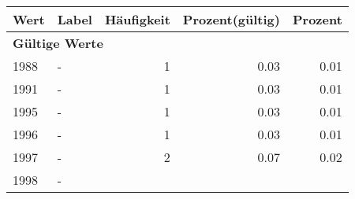      \begin{longtable}{lXrrr}
     \toprule
     \textbf{Wert} & \textbf{Label} & \textbf{Häufigkeit} & \textbf{Prozent(gültig)} & \textbf{Prozent} \\
     \endhead
     \midrule
     \multicolumn{5}{l}{\textbf{Gültige Werte}}\\

     1988 &
     \multicolumn{1}{X}{ -  } &


       \num{1} &
       \num[round-mode=places,round-precision=2]{0.03} &
         \num[round-mode=places,round-precision=2]{0.01} \\

     1991 &
     \multicolumn{1}{X}{ -  } &


       \num{1} &
       \num[round-mode=places,round-precision=2]{0.03} &
         \num[round-mode=places,round-precision=2]{0.01} \\

     1995 &
     \multicolumn{1}{X}{ -  } &


       \num{1} &
       \num[round-mode=places,round-precision=2]{0.03} &
         \num[round-mode=places,round-precision=2]{0.01} \\

     1996 &
     \multicolumn{1}{X}{ -  } &


       \num{1} &
       \num[round-mode=places,round-precision=2]{0.03} &
         \num[round-mode=places,round-precision=2]{0.01} \\

     1997 &
     \multicolumn{1}{X}{ -  } &


       \num{2} &
       \num[round-mode=places,round-precision=2]{0.07} &
         \num[round-mode=places,round-precision=2]{0.02} \\

     1998 &
     \multicolumn{1}{X}{ -  } &



\end{longtable}
